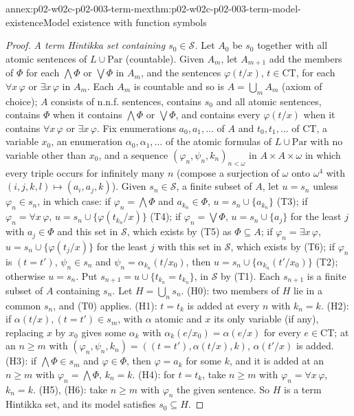\begin{annexitem}{annex:p02-w02c-p02-003-term-mex}{thm:p02-w02c-p02-003-term-model-existence}{Model existence with function symbols}
\begin{proof}
\emph{A term Hintikka set containing \(s_0\in\mathcal S\).}  Let \(A_0\) be
\(s_0\) together with all atomic sentences of \(L\cup\mathrm{Par}\)
(countable).  Given \(A_m\), let \(A_{m+1}\) add the members of \(\Phi\)
for each \(\bigwedge\Phi\) or \(\bigvee\Phi\) in \(A_m\), and the sentences
\(\varphi(t/x)\), \(t\in\mathrm{CT}\), for each \(\forall x\,\varphi\) or
\(\exists x\,\varphi\) in \(A_m\).  Each \(A_m\) is countable and so is
\(A=\bigcup_m A_m\) (axiom of choice); \(A\) consists of n.n.f. sentences,
contains \(s_0\) and all atomic sentences, contains \(\Phi\) when it contains
\(\bigwedge\Phi\) or \(\bigvee\Phi\), and contains every \(\varphi(t/x)\)
when it contains \(\forall x\,\varphi\) or \(\exists x\,\varphi\).  Fix
enumerations \(a_0,a_1,\ldots\) of \(A\) and \(t_0,t_1,\ldots\) of
\(\mathrm{CT}\), a variable \(x_0\), an enumeration
\(\alpha_0,\alpha_1,\ldots\) of the atomic formulas of
\(L\cup\mathrm{Par}\) with no variable other than \(x_0\), and a sequence
\((\varphi_n,\psi_n,k_n)_{n<\omega}\) in \(A\times A\times\omega\) in which
every triple occurs for infinitely many \(n\) (compose a surjection of
\(\omega\) onto \(\omega^{4}\) with \((i,j,k,l)\mapsto(a_i,a_j,k)\)).
Given \(s_n\in\mathcal S\), a finite subset of \(A\), let \(u=s_n\) unless
\(\varphi_n\in s_n\), in which case: if \(\varphi_n=\bigwedge\Phi\) and
\(a_{k_n}\in\Phi\), \(u=s_n\cup\{a_{k_n}\}\) (T3); if
\(\varphi_n=\forall x\,\varphi\), \(u=s_n\cup\{\varphi(t_{k_n}/x)\}\) (T4);
if \(\varphi_n=\bigvee\Phi\), \(u=s_n\cup\{a_j\}\) for the least \(j\) with
\(a_j\in\Phi\) and this set in \(\mathcal S\), which exists by (T5) as
\(\Phi\subseteq A\); if \(\varphi_n=\exists x\,\varphi\),
\(u=s_n\cup\{\varphi(t_j/x)\}\) for the least \(j\) with this set in
\(\mathcal S\), which exists by (T6); if \(\varphi_n\) is \((t=t')\),
\(\psi_n\in s_n\) and \(\psi_n=\alpha_{k_n}(t/x_0)\), then
\(u=s_n\cup\{\alpha_{k_n}(t'/x_0)\}\) (T2); otherwise \(u=s_n\).  Put
\(s_{n+1}=u\cup\{t_{k_n}=t_{k_n}\}\), in \(\mathcal S\) by (T1).  Each
\(s_{n+1}\) is a finite subset of \(A\) containing \(s_n\).  Let
\(H=\bigcup_n s_n\).  (H0): two members of \(H\) lie in a common \(s_n\),
and (T0) applies.  (H1): \(t=t_k\) is added at every \(n\) with \(k_n=k\).
(H2): if \(\alpha(t/x),(t=t')\in s_m\), with \(\alpha\) atomic and \(x\) its
only variable (if any), replacing \(x\) by \(x_0\) gives some \(\alpha_k\)
with \(\alpha_k(e/x_0)=\alpha(e/x)\) for every \(e\in\mathrm{CT}\); at an
\(n\geq m\) with \((\varphi_n,\psi_n,k_n)=((t=t'),\alpha(t/x),k)\),
\(\alpha(t'/x)\) is added.  (H3): if \(\bigwedge\Phi\in s_m\) and
\(\varphi\in\Phi\), then \(\varphi=a_k\) for some \(k\), and it is added at
an \(n\geq m\) with \(\varphi_n=\bigwedge\Phi\), \(k_n=k\).  (H4): for
\(t=t_k\), take \(n\geq m\) with \(\varphi_n=\forall x\,\varphi\),
\(k_n=k\).  (H5), (H6): take \(n\geq m\) with \(\varphi_n\) the given
sentence.  So \(H\) is a term Hintikka set, and its model satisfies
\(s_0\subseteq H\).
\end{proof}
\end{annexitem}

